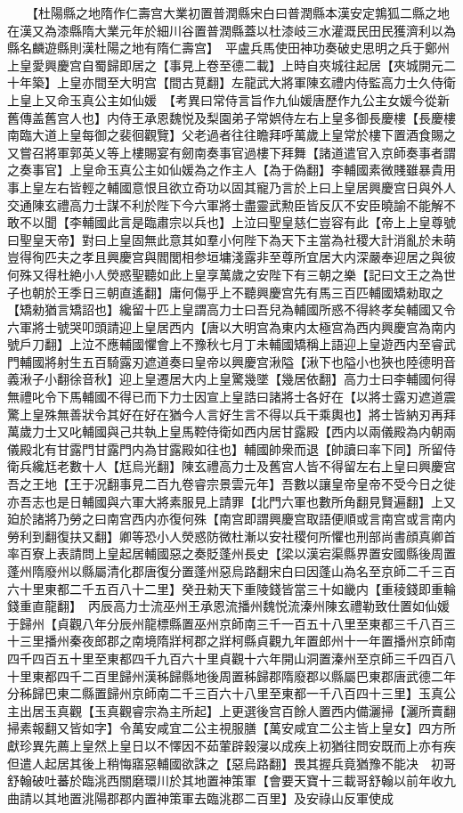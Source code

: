 　　【杜陽縣之地隋作仁壽宫大業初置普潤縣宋白曰普潤縣本漢安定鶉狐二縣之地在漢又為漆縣隋大業元年於細川谷置普潤縣蓋以杜漆岐三水灌溉民田民獲濟利以為縣名麟遊縣則漢杜陽之地有隋仁壽宫】　平盧兵馬使田神功奏破史思明之兵于鄭州上皇愛興慶宫自蜀歸即居之【事見上卷至德二載】上時自夾城往起居【夾城開元二十年築】上皇亦間至大明宫【間古莧翻】左龍武大將軍陳玄禮内侍監高力士久侍衛上皇上又命玉真公主如仙媛　【考異曰常侍言旨作九仙媛唐歷作九公主女媛今從新舊傳盖舊宫人也】内侍王承恩魏悦及梨園弟子常娯侍左右上皇多御長慶樓【長慶樓南臨大道上皇每御之裴徊觀覽】父老過者往往瞻拜呼萬歲上皇常於樓下置酒食賜之又嘗召將軍郭英乂等上樓賜宴有劒南奏事官過樓下拜舞【諸道遣官入京師奏事者謂之奏事官】上皇命玉真公主如仙媛為之作主人【為于偽翻】李輔國素微賤雖暴貴用事上皇左右皆輕之輔國意恨且欲立奇功以固其寵乃言於上曰上皇居興慶宫日與外人交通陳玄禮高力士謀不利於陛下今六軍將士盡靈武勲臣皆反仄不安臣曉諭不能解不敢不以聞【李輔國此言是臨肅宗以兵也】上泣曰聖皇慈仁豈容有此【帝上上皇尊號曰聖皇天帝】對曰上皇固無此意其如羣小何陛下為天下主當為社稷大計消亂於未萌豈得徇匹夫之孝且興慶宫與閻閭相参垣墉淺露非至尊所宜居大内深嚴奉迎居之與彼何殊又得杜絶小人熒惑聖聽如此上皇享萬歲之安陛下有三朝之樂【記曰文王之為世子也朝於王季日三朝直遙翻】庸何傷乎上不聽興慶宫先有馬三百匹輔國矯勑取之【矯勑猶言矯詔也】纔留十匹上皇謂高力士曰吾兒為輔國所惑不得終孝矣輔國又令六軍將士號哭叩頭請迎上皇居西内【唐以大明宫為東内太極宫為西内興慶宫為南内號戶刀翻】上泣不應輔國懼會上不豫秋七月丁未輔國矯稱上語迎上皇遊西内至睿武門輔國將射生五百騎露刃遮道奏曰皇帝以興慶宫湫隘【湫下也隘小也狹也陸德明音義湫子小翻徐音秋】迎上皇遷居大内上皇驚幾墜【幾居依翻】高力士曰李輔國何得無禮叱令下馬輔國不得已而下力士因宣上皇誥曰諸將士各好在【以將士露刃遮道震驚上皇殊無善狀令其好在好在猶今人言好生言不得以兵干乘輿也】將士皆納刃再拜萬歲力士又叱輔國與己共執上皇馬鞚侍衛如西内居甘露殿【西内以兩儀殿為内朝兩儀殿北有甘露門甘露門内為甘露殿如往也】輔國帥衆而退【帥讀曰率下同】所留侍衛兵纔尪老數十人【尪烏光翻】陳玄禮高力士及舊宫人皆不得留左右上皇曰興慶宫吾之王地【王于况翻事見二百九卷睿宗景雲元年】吾數以讓皇帝皇帝不受今日之徙亦吾志也是日輔國與六軍大將素服見上請罪【北門六軍也數所角翻見賢遍翻】上又廹於諸將乃勞之曰南宫西内亦復何殊【南宫即謂興慶宫取語便順或言南宫或言南内勞利到翻復扶又翻】卿等恐小人熒惑防微杜漸以安社稷何所懼也刑部尚書顔真卿首率百寮上表請問上皇起居輔國惡之奏貶蓬州長史【梁以漢宕渠縣界置安國縣後周置蓬州隋廢州以縣屬清化郡唐復分置蓬州惡烏路翻宋白曰因蓬山為名至京師二千三百六十里東都二千五百八十二里】癸丑勑天下重陵錢皆當三十如畿内【重稜錢即重輪錢重直龍翻】　丙辰高力士流巫州王承恩流播州魏悦流溱州陳玄禮勒致仕置如仙媛于歸州【貞觀八年分辰州龍標縣置巫州京師南三千一百五十八里至東都三千八百三十三里播州秦夜郎郡之南境隋牂柯郡之牂柯縣貞觀九年置郎州十一年置播州京師南四千四百五十里至東都四千九百六十里貞觀十六年開山洞置溱州至京師三千四百八十里東都四千二百里歸州漢秭歸縣地後周置秭歸郡隋廢郡以縣屬巴東郡唐武德二年分秭歸巴東二縣置歸州京師南二千三百六十八里至東都一千八百四十三里】玉真公主出居玉真觀【玉真觀睿宗為主所起】上更選後宫百餘人置西内備灑掃【灑所賣翻掃素報翻又皆如字】令萬安咸宜二公主視服膳【萬安咸宜二公主皆上皇女】四方所獻珍異先薦上皇然上皇日以不懌因不茹葷辟穀寖以成疾上初猶往問安既而上亦有疾但遣人起居其後上稍悔寤惡輔國欲誅之【惡烏路翻】畏其握兵竟猶豫不能决　初哥舒翰破吐蕃於臨洮西關磨環川於其地置神策軍【會要天寶十三載哥舒翰以前年收九曲請以其地置洮陽郡郡内置神策軍去臨洮郡二百里】及安祿山反軍使成